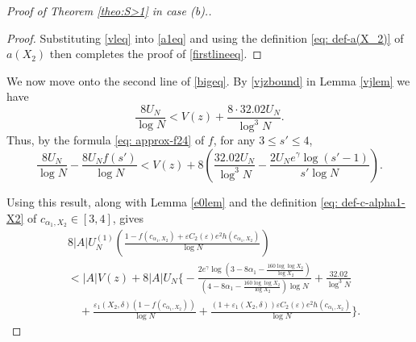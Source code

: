 \documentclass[12pt]{amsart}
\begin{document}
\begin{proof}[Proof of Theorem \ref{theo:S>1} in case (b).]
\begin{proof}
Substituting \eqref{vleq} into \eqref{a1eq} and using the definition \eqref{eq: def-a(X_2)} of $a(X_2)$ then completes the proof of \eqref{firstlineeq}.
\end{proof}

We now move onto the second line of \eqref{bigeq}. By \eqref{vjzbound} in Lemma \ref{vjlem} we have
\begin{equation*}
    \frac{8 U_N}{\log N} < V(z) + \frac{8 \cdot 32.02 U_N}{\log^3 N}.
\end{equation*}
Thus, by the formula \eqref{eq: approx-f24} of $f$, for any $3 \le s' \le 4$, %
\begin{equation*}
    \frac{8U_N}{\log N}-\frac{8U_Nf(s')}{\log N}<V(z)+8\left(\frac{32.02 U_N}{\log^3 N}-\frac{2U_N e^{\gamma}\log(s'-1)}{s'\log N}\right).
\end{equation*}

Using this result, along with Lemma \ref{e0lem} and the definition \eqref{eq: def-c-alpha1-X2} of $c_{\alpha_1,X_2} \in [3,4]$, gives
\begin{align}
    &8|A|U_N^{(1)}\left(\frac{1-f(c_{\alpha_1,X_2})+\varepsilon C_2(\varepsilon)e^2h(c_{\alpha_1,X_2})}{\log N}\right) \nonumber\\
    &<|A|V(z)+8|A|U_N\Bigg\{-\frac{2e^{\gamma}\log\left(3-8\alpha_1-\frac{160\log\log X_2}{\log X_2}\right)}{(4-8\alpha_1-\frac{160\log\log X_2}{\log X_2})\log N}+\frac{32.02}{\log^3 N} \nonumber\\
    &\quad+\frac{\varepsilon_1(X_2,\delta)(1-f(c_{\alpha_1,X_2}))}{\log N}+\frac{(1+\varepsilon_1(X_2,\delta))\varepsilon C_2(\varepsilon)e^2h(c_{\alpha_1,X_2})}{\log N}\Bigg\}. \label{eq: bound-U-N-1}
\end{align}


\end{proof}
\end{document}
